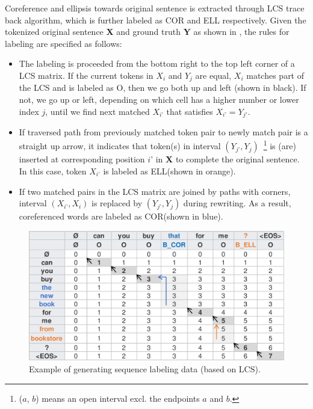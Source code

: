 Coreference and ellipsis towards original sentence is extracted through LCS trace back algorithm, which is further labeled as COR and ELL respectively. Given the tokenized original sentence \textbf{X} and ground truth \textbf{Y} as shown in , the rules for labeling are specified as follows:
\begin{itemize}
\item {
The labeling is proceeded from the bottom right to the top left corner of a LCS matrix. If the current tokens in $X_i$ and $Y_j$ are equal, $X_i$ matches part of the LCS and is labeled as O, then we go both up and left (shown in black). If not, we go up or left, depending on which cell has a higher number or lower index $j$, until we find next matched $X_{i’}$ that satisfies $X_{i’}=Y_{j'}$.} 
\item {If traversed path from previously matched token pair to newly match pair is a straight up arrow, it indicates that token(s) in interval
$(Y_{j’},Y_j)$~\footnote{($a$, $b$) means an open interval excl. the endpoints $a$ and $b$.}
is (are) inserted at corresponding position $i’$ in \textbf{X} to complete 
the original sentence. In this case, token $X_{i’}$ is labeled as ELL(shown in orange).}
\item {If two matched pairs in the LCS matrix are joined by paths with corners, interval $(X_{i’},X_i)$ is replaced by $(Y_{j’},Y_j)$ during rewriting. As a result, coreferenced words are labeled as COR(shown in blue).}
\end{itemize}

\begin{figure}[th]
        \centering
        \includegraphics[width=1.0\columnwidth]{lcs.eps}
        \caption{Example of generating sequence labeling data (based on LCS).}
        \label{fig:lcs}
\end{figure}



